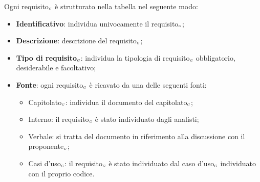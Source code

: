 Ogni requisito$_{\scaleto{G}{3pt}}$ è strutturato nella tabella nel seguente modo:
\begin{itemize}
	\item \textbf{Identificativo}: individua univocamente il requisito$_{\scaleto{G}{3pt}}$;
	\item \textbf{Descrizione}: descrizione del requisito$_{\scaleto{G}{3pt}}$; %
	\item \textbf{Tipo di requisito$_{\scaleto{G}{3pt}}$}: individua la tipologia di requisito$_{\scaleto{G}{3pt}}$ obbligatorio, desiderabile e facoltativo;
	\item \textbf{Fonte}: ogni requisito$_{\scaleto{G}{3pt}}$ è ricavato da una delle seguenti fonti:
	\begin{itemize}
		\item Capitolato$_{\scaleto{G}{3pt}}$: individua il documento del capitolato$_{\scaleto{G}{3pt}}$;
		\item Interno: il requisito$_{\scaleto{G}{3pt}}$ è stato individuato dagli analisti;
		\item Verbale: si tratta del documento in riferimento alla discussione con il proponente$_{\scaleto{G}{3pt}}$;
		\item Casi d'uso$_{\scaleto{G}{3pt}}$: il requisito$_{\scaleto{G}{3pt}}$ è stato individuato dal caso d'uso$_{\scaleto{G}{3pt}}$ individuato con il proprio codice.
	\end{itemize}
\end{itemize}

